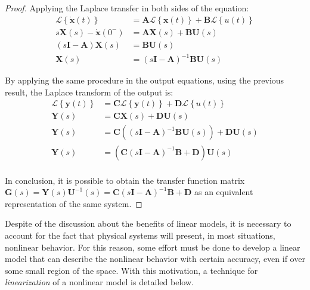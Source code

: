 \documentclass[a4paper,11pt]{book}
\numberwithin{figure}{chapter}
\numberwithin{equation}{chapter}
\numberwithin{table}{chapter}
\theoremstyle{definition}
\begin{document}
\begin{proof}
	Applying the Laplace transfer in both sides of the equation:
	\begin{equation} \label{eq:convertSSIO01}
	\begin{split}
		\mathcal{L} \left\{ \dot{\bm{x}}(t) \right\} &= \bm{A} \mathcal{L} \left\{ \bm{x}(t) \right\} + \bm{B} \mathcal{L} \left\{ u(t) \right\} \\
		s \bm{X}(s) - \dot{\bm{x}}(0^-) &= \bm{A} \bm{X}(s) + \bm{B} \bm{U}(s) \\
		(s\bm{I}  - \bm{A}) \bm{X}(s) &=  \bm{B} \bm{U}(s) \\
		 \bm{X}(s) &= (s\bm{I}  - \bm{A})^{-1} \bm{B} \bm{U}(s)
	\end{split}
	\end{equation}
	
	By applying the same procedure in the output equations, using the previous result, the Laplace transform of the output is:
	\begin{equation} \label{eq:convertSSIO02}
	\begin{split}
		\mathcal{L} \left\{ \bm{y}(t) \right\} &= \bm{C} \mathcal{L} \left\{ \bm{y}(t) \right\} + \bm{D} \mathcal{L} \left\{ u(t) \right\} \\
		\bm{Y}(s)  &= \bm{C} \bm{X}(s) + \bm{D} \bm{U}(s) \\
		\bm{Y}(s)  &= \bm{C} \left( (s\bm{I}  - \bm{A})^{-1} \bm{B} \bm{U}(s) \right) + \bm{D} \bm{U}(s) \\
		\bm{Y}(s)  &= \left( \bm{C} (s\bm{I} - \bm{A})^{-1} \bm{B}   + \bm{D} \right) \bm{U}(s) \\
	\end{split}
	\end{equation}
	
	In conclusion, it is possible to obtain the transfer function matrix $\bm{G}(s) = \bm{Y}(s)\bm{U}^{-1}(s) = \bm{C} (s\bm{I} - \bm{A})^{-1} \bm{B}   + \bm{D}$ as an equivalent representation of the same system.
\end{proof}

Despite of the discussion about the benefits of linear models, it is necessary to account for the fact that physical systems will present, in most situations, nonlinear behavior. For this reason, some effort must be done to develop a linear model that can describe the nonlinear behavior with certain accuracy, even if over some small region of the space. With this motivation, a technique for \textit{linearization} of a nonlinear model is detailed below.
\end{document}
